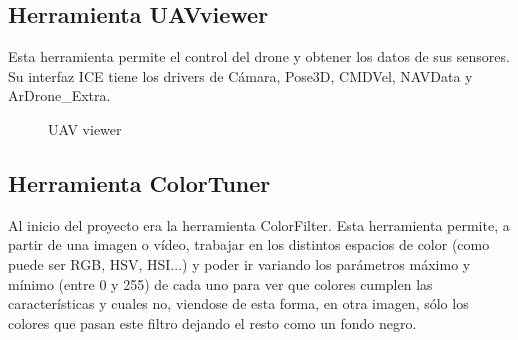 \subsection{Herramienta UAVviewer}
\label{sec:uavviewer}
\hspace{1 cm} Esta herramienta permite el control del drone y obtener los datos de sus sensores. Su interfaz ICE tiene los drivers de C\'amara, Pose3D, CMDVel, NAVData y ArDrone\_Extra. 

\begin{figure}[H]
 \centering
 \caption{UAV viewer}
 \label{f:UAVViewerTotal}
\end{figure} 


\subsection{Herramienta ColorTuner}
\hspace{1 cm} Al inicio del proyecto era la herramienta ColorFilter. Esta herramienta permite, a partir de una imagen o v\'ideo, trabajar en los distintos espacios de color (como puede ser RGB, HSV, HSI...) y poder ir variando los par\'ametros m\'aximo y m\'inimo (entre 0 y 255) de cada uno para ver que colores cumplen las caracter\'isticas y cuales no, viendose de esta forma, en otra imagen, s\'olo los colores que pasan este filtro dejando el resto como un fondo negro. 

